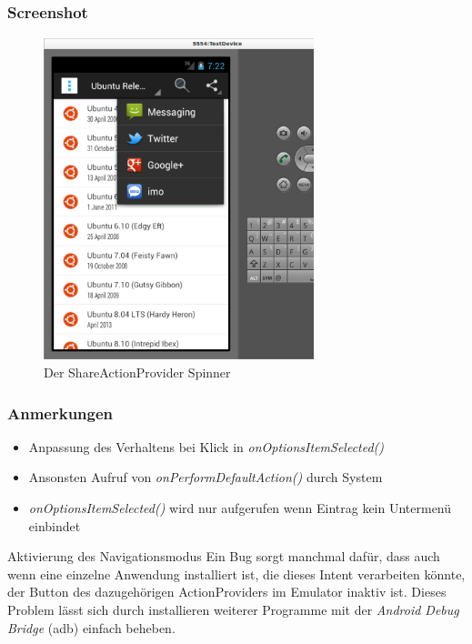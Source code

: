 \begin{frame}
   \frametitle{Screenshot}
   \begin{figure}[h!]
     \centering
     \includegraphics[width=0.7\textwidth]{pictures/shareActionProvider.ps}
     \caption{
        Der ShareActionProvider Spinner
     }
     \label{fig:shareActionProvider}
   \end{figure}
\end{frame}

\begin{frame}
   \frametitle{Anmerkungen}
   \begin{itemize}
      \item Anpassung des Verhaltens bei Klick in \emph{onOptionsItemSelected()}
      \item Ansonsten Aufruf von \emph{onPerformDefaultAction()} durch System
      \item \emph{onOptionsItemSelected()} wird nur aufgerufen wenn Eintrag kein 
         Untermenü einbindet
   \end{itemize}

   \begin{alertblock}{Aktivierung des Navigationsmodus}
      Ein Bug sorgt manchmal dafür, dass auch wenn eine einzelne Anwendung 
      installiert ist, die dieses Intent verarbeiten könnte, der Button des dazugehörigen 
      ActionProviders im Emulator inaktiv ist. Dieses Problem lässt sich durch installieren 
      weiterer Programme mit der \emph{Android Debug Bridge} (adb) einfach beheben.
   \end{alertblock}
\end{frame}

